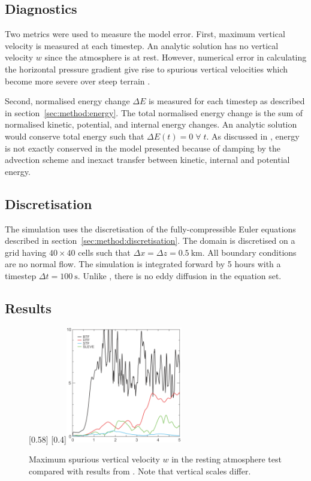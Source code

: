 \subsection{Diagnostics}
Two metrics were used to measure the model error.  First, maximum vertical velocity is measured at each timestep.  An analytic solution has no vertical velocity $w$ since the atmosphere is at rest.  However, numerical error in calculating the horizontal pressure gradient give rise to spurious vertical velocities which become more severe over steep terrain \autocite{klemp2011}.

Second, normalised energy change $\Delta E$ is measured for each timestep as described in section~\ref{sec:method:energy}.  The total normalised energy change is the sum of normalised kinetic, potential, and internal energy changes.
An analytic solution would conserve total energy such that $\Delta E(t) = 0\;\forall\;t$.  As discussed in \textcite{weller-shahrokhi2014}, energy is not exactly conserved in the model presented because of damping by the advection scheme and inexact transfer between kinetic, internal and potential energy.

\subsection{Discretisation}
The simulation uses the discretisation of the fully-compressible Euler equations described in section~\ref{sec:method:discretisation}.  The domain is discretised on a grid having $40 \times 40$ cells such that $\Delta x = \Delta z = \SI{0.5}{\kilo\meter}$.  All boundary conditions are no normal flow.  The simulation is integrated forward by 5 hours with a timestep $\Delta t = \SI{100}{\second}$.  Unlike \textcite{klemp2011}, there is no eddy diffusion in the equation set.

\subsection{Results}
\begin{figure}
	\captionsetup[subfigure]{position=b}
	\centering
	[0.58\textwidth]{}
	\hfill
	[0.4\textwidth]{\vspace{0.27in}\includegraphics[height=2in]{img/klemp-w.png}}
	\caption{Maximum spurious vertical velocity $w$ in the resting atmosphere test compared with results from \textcite{klemp2011}.  Note that vertical scales differ.}
	\label{fig:resting:w}
\end{figure}


